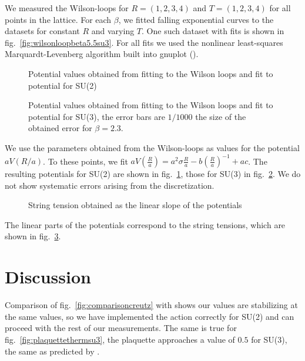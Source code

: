 \documentclass[%
 reprint,
 amsmath,amssymb,
 aps,
]{revtex4-1}
\begin{document}
We measured the Wilson-loops for $R=(1,2,3,4)$ and $T=(1,2,3,4)$ for all points in the lattice. For each $\beta$, we fitted falling exponential curves to the datasets for constant $R$ and varying $T$. One such dataset with fits is shown in fig.~\ref{fig:wilsonloopbeta5.5su3}. For all fits we used the nonlinear least-squares Marquardt-Levenberg algorithm built into gnuplot (\citet{gnuplotdoc}).



\begin{figure}
	\centering
	
	\caption[Potentials obtained using SU(2)]{Potential values obtained from fitting to the Wilson loops and fit to potential for SU(2)}
	\label{fig:fittedpotentialssu2}
\end{figure} 


\begin{figure}
	\centering
	
	\caption[Potentials obtained using SU(3)]{Potential values obtained from fitting to the Wilson loops and fit to potential for SU(3), the error bars are $1/1000$ the size of the obtained error for $\beta=2.3$.}
	\label{fig:fittedpotentialssu3}
\end{figure} 

We use the parameters obtained from the Wilson-loops as values for the potential $aV(R/a)$. To these points, we fit $aV\left(\frac{R}{a}\right)=a^2\sigma \frac{R}{a}-b\left(\frac{R}{a}\right)^{-1}+ac$. The resulting potentials for SU(2) are shown in fig.~\ref{fig:fittedpotentialssu2}, those for SU(3) in fig.~\ref{fig:fittedpotentialssu3}. We do not show systematic errors arising from the discretization.


\begin{figure}
	\centering
	
	\caption[String tension obtained from potential]{String tension obtained as the linear slope of the potentials}
	\label{fig:stringtension}
\end{figure}

The linear parts of the potentials correspond to the string tensions, which are shown in fig.~\ref{fig:stringtension}.

\section{Discussion}

Comparison of fig.~\ref{fig:comparisoncreutz} with \citet{creutzsu2} shows our values are stabilizing at the same values, so we have implemented the action correctly for SU(2) and can proceed with the rest of our measurements. The same is true for fig.~\ref{fig:plaquettethermsu3}, the plaquette approaches a value of $0.5$ for SU(3), the same as predicted by \citet{lepagelqcd}. 
\end{document}
